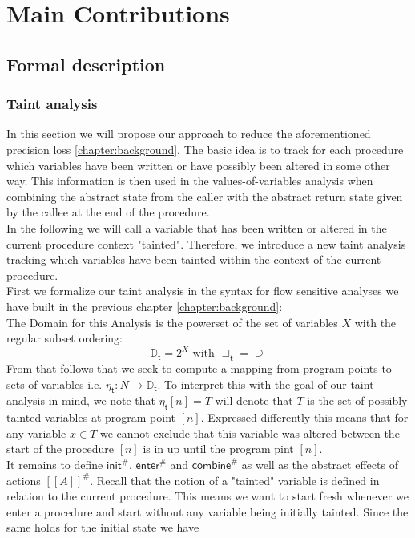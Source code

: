 
\chapter{Main Contributions}\label{chapter:mainContributions}

  \section{Formal description}
    \subsection{Taint analysis}
      In this section we will propose our approach to reduce the aforementioned precision loss \ref{chapter:background}. The basic idea is to track for each procedure which variables have been written or have possibly been altered in some other way. This information is then used in the values-of-variables analysis when combining the abstract state from the caller with the abstract return state given by the callee at the end of the procedure.\\
      In the following we will call a variable that has been written or altered in the current procedure context "tainted". Therefore, we introduce a new taint analysis tracking which variables have been tainted within the context of the current procedure.\\
      First we formalize our taint analysis in the syntax for flow sensitive analyses we have built in the previous chapter \ref{chapter:background}:\\
      The Domain for this Analysis is the powerset of the set of variables $X$ with the regular subset ordering:
      \[\mathbb{D}_\textsf{t} = 2^X \text{ with } \sqsupseteq_\textsf{t} = \supseteq\]
      From that follows that we seek to compute a mapping from program points to sets of variables i.e. $\eta_\textsf{t}: N \rightarrow \mathbb{D}_\textsf{t}$. To interpret this with the goal of our taint analysis in mind, we note that $\eta_\textsf{t} [n] = T$ will denote that $T$ is the set of possibly tainted variables at program point $[n]$. Expressed differently this means that for any variable $x \in T$ we cannot exclude that this variable was altered between the start of the procedure $[n]$ is in up until the program pint $[n]$.\\
      It remains to define $\textsf{init}^{\#}$, $\textsf{enter}^{\#}$ and $\textsf{combine}^{\#}$ as well as the abstract effects of actions $[\![  A ]\!]^{\#}$. Recall that the notion of a "tainted" variable is defined in relation to the current procedure. This means we want to start fresh whenever we enter a procedure and start without any variable being initially tainted. Since the same holds for the initial state we have 
